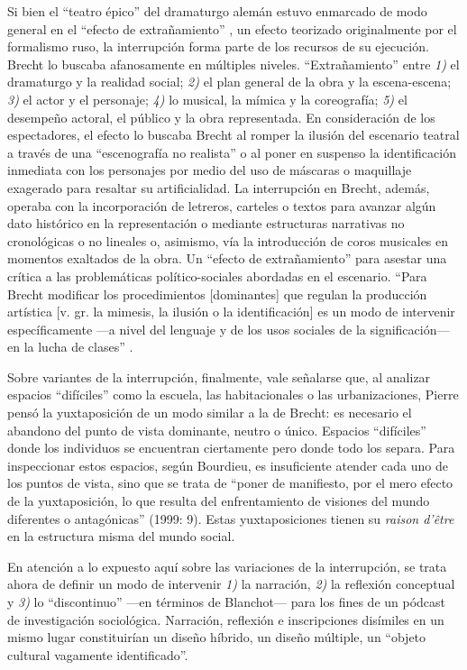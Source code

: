 \documentclass[
  spanish,
  11pt,
  a4paper,
]{scrbook}
\begin{document}
Si bien el ``teatro épico'' del dramaturgo alemán estuvo enmarcado de
modo general en el ``efecto de extrañamiento'' \autocite[§45,
47]{Brecht2019}, un efecto teorizado originalmente por el formalismo
ruso, la interrupción forma parte de los recursos de su ejecución.
Brecht lo buscaba afanosamente en múltiples niveles. ``Extrañamiento''
entre \emph{1)} el dramaturgo y la realidad social; \emph{2)} el plan
general de la obra y la escena-escena; \emph{3)} el actor y el
personaje; \emph{4)} lo musical, la mímica y la coreografía; \emph{5)}
el desempeño actoral, el público y la obra representada. En
consideración de los espectadores, el efecto lo buscaba Brecht al romper
la ilusión del escenario teatral a través de una ``escenografía no
realista'' o al poner en suspenso la identificación inmediata con los
personajes por medio del uso de máscaras o maquillaje exagerado para
resaltar su artificialidad. La interrupción en Brecht, además, operaba
con la incorporación de letreros, carteles o textos para avanzar algún
dato histórico en la representación o mediante estructuras narrativas no
cronológicas o no lineales o, asimismo, vía la introducción de coros
musicales en momentos exaltados de la obra. Un ``efecto de
extrañamiento'' para asestar una crítica a las problemáticas
político-sociales abordadas en el escenario. ``Para Brecht modificar los
procedimientos {[}dominantes{]} que regulan la producción artística
{[}v. gr. la mimesis, la ilusión o la identificación{]} es un modo de
intervenir específicamente ---a nivel del lenguaje y de los usos
sociales de la significación--- en la lucha de clases''
\autocite[68-69]{Piglia2015}.

Sobre variantes de la interrupción, finalmente, vale señalarse que, al
analizar espacios ``difíciles'' como la escuela, las habitacionales o
las urbanizaciones, Pierre \textcite{Bourdieu1999} pensó la
yuxtaposición de un modo similar a la de Brecht: es necesario el
abandono del punto de vista dominante, neutro o único. Espacios
``difíciles'' donde los individuos se encuentran ciertamente pero donde
todo los separa. Para inspeccionar estos espacios, según Bourdieu, es
insuficiente atender cada uno de los puntos de vista, sino que se trata
de ``poner de manifiesto, por el mero efecto de la yuxtaposición, lo que
resulta del enfrentamiento de visiones del mundo diferentes o
antagónicas'' (1999: 9). Estas yuxtaposiciones tienen su \emph{raison
d'être} en la estructura misma del mundo social.

En atención a lo expuesto aquí sobre las variaciones de la interrupción,
se trata ahora de definir un modo de intervenir \emph{1)} la narración,
\emph{2)} la reflexión conceptual y \emph{3)} lo ``discontinuo'' ---en
términos de Blanchot--- para los fines de un pódcast de investigación
sociológica. Narración, reflexión e inscripciones disímiles en un mismo
lugar constituirían un diseño híbrido, un diseño múltiple, un ``objeto
cultural vagamente identificado''.
\end{document}

